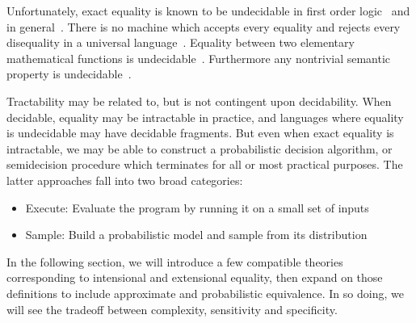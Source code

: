 \documentclass[11pt]{article}
\begin{document}
    Unfortunately, exact equality is known to be undecidable in first order logic~\cite{godel1929vollstandigkeit} and in general~\cite{godel1931formal}. There is no machine which accepts every equality and rejects every disequality in a universal language~\cite{turing1937computable}. Equality between two elementary mathematical functions is undecidable~\cite{richardson1994identity}. Furthermore any nontrivial semantic property is undecidable~\cite{rice1953classes}.


    Tractability may be related to, but is not contingent upon decidability. When decidable, equality may be intractable in practice, and languages where equality is undecidable may have decidable fragments. But even when exact equality is intractable, we may be able to construct a probabilistic decision algorithm, or semidecision procedure which terminates for all or most practical purposes. The latter approaches fall into two broad categories:

    \begin{itemize}
        \item Execute: Evaluate the program by running it on a small set of inputs
        \item Sample: Build a probabilistic model and sample from its distribution
    \end{itemize}

    In the following section, we will introduce a few compatible theories corresponding to intensional and extensional equality, then expand on those definitions to include approximate and probabilistic equivalence. In so doing, we will see the tradeoff between complexity, sensitivity and specificity.

%


\end{document}
